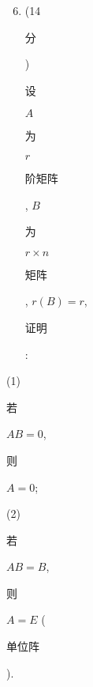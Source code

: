 \documentclass[10pt]{article}
\begin{document}
\begin{enumerate}
  \setcounter{enumi}{5}
  \item (14 \begin{CJK}{UTF8}{mj}分\end{CJK}) \begin{CJK}{UTF8}{mj}设\end{CJK} $A$ \begin{CJK}{UTF8}{mj}为\end{CJK} $r$ \begin{CJK}{UTF8}{mj}阶矩阵\end{CJK}, $B$ \begin{CJK}{UTF8}{mj}为\end{CJK} $r \times n$ \begin{CJK}{UTF8}{mj}矩阵\end{CJK}, $r(B)=r$, \begin{CJK}{UTF8}{mj}证明\end{CJK}:
\end{enumerate}
(1) \begin{CJK}{UTF8}{mj}若\end{CJK} $A B=0$, \begin{CJK}{UTF8}{mj}则\end{CJK} $A=0$;

(2) \begin{CJK}{UTF8}{mj}若\end{CJK} $A B=B$, \begin{CJK}{UTF8}{mj}则\end{CJK} $A=E$ (\begin{CJK}{UTF8}{mj}单位阵\end{CJK}).
\end{document}
